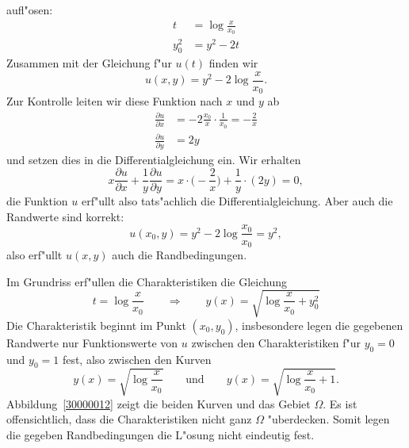 \begin{loesung}
\begin{teilaufgaben}
aufl"osen: 
\begin{align*}
t&=\log\frac{x}{x_0}\\
y_0^2&=y^2-2t
\end{align*}
Zusammen mit der Gleichung f"ur $u(t)$ finden wir
\[
u(x,y) = y^2 - 2\log\frac{x}{x_0}.
\]
Zur Kontrolle leiten wir diese Funktion nach $x$ und $y$ ab
\begin{align*}
\frac{\partial u}{\partial x}
&=
-2\frac{x_0}{x}\cdot\frac1{x_0}=-\frac2x
\\
\frac{\partial u}{\partial y}
&=
2y
\end{align*}
und setzen dies in die Differentialgleichung ein.
Wir erhalten
\[
x\frac{\partial u}{\partial x} + \frac1y\frac{\partial u}{\partial y}
=
x\cdot \biggl(-\frac{2}{x}\biggr)
+ \frac1y\cdot (2y)
=
0,
\]
die Funktion $u$ erf"ullt also tats"achlich die Differentialgleichung.
Aber auch die Randwerte sind korrekt:
\[
u(x_0,y)=y^2-2\log\frac{x_0}{x_0}=y^2,
\]
also erf"ullt $u(x,y)$ auch die Randbedingungen.
\item
Im Grundriss erf"ullen die Charakteristiken die Gleichung
\[
t = \log\frac{x}{x_0}
\qquad\Rightarrow\qquad
y(x)=\sqrt{\log\frac{x}{x_0}+y_0^2}
\]
Die Charakteristik beginnt im Punkt $(x_0,y_0)$, insbesondere legen die
gegebenen Randwerte nur Funktionswerte von $u$ zwischen den Charakteristiken
f"ur $y_0=0$ und $y_0=1$ fest, also zwischen den Kurven
\[
y(x) = \sqrt{\log\frac{x}{x_0}}
\qquad\text{und}\qquad
y(x) = \sqrt{\log\frac{x}{x_0}+1}.
\]
Abbildung~\ref{30000012} zeigt die beiden Kurven und das Gebiet $\Omega$.
Es ist offensichtlich, dass die Charakteristiken nicht ganz $\Omega$
"uberdecken.
Somit legen die gegeben Randbedingungen die L"osung nicht eindeutig fest.
\qedhere
\end{teilaufgaben}
\end{loesung}
